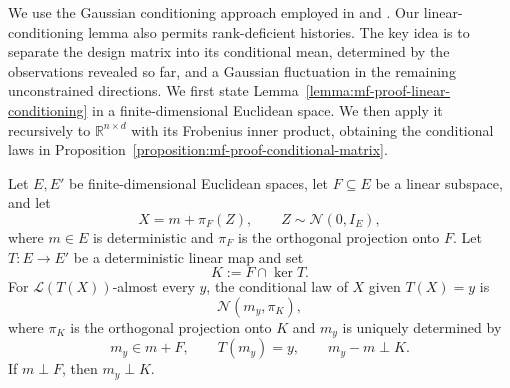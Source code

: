     We use the Gaussian conditioning approach employed in
    \cite{bolthausen2014} and
    \cite[Section~III-H, Lemmas~10--11]{bayati2011dynamics}.
    Our linear-conditioning lemma also permits rank-deficient histories.
    The key idea is to separate the design matrix into its
    conditional mean, determined by the observations revealed so far,
    and a Gaussian fluctuation in the remaining unconstrained directions.
    We first state
    Lemma~\ref{lemma:mf-proof-linear-conditioning}
    in a finite-dimensional Euclidean space.
    We then apply it recursively to $\mathbb R^{n\times d}$
    with its Frobenius inner product, obtaining the conditional
    laws in Proposition~\ref{proposition:mf-proof-conditional-matrix}.

        \begin{lemma}
        \label{lemma:mf-proof-linear-conditioning}
        Let $E,E'$ be finite-dimensional Euclidean spaces,
        let $F\subseteq E$ be a linear subspace, and let
        \[
            X=m+\pi_F (Z),
            \qquad
            Z\sim\mathcal N(0,I_E),
        \]
        where $m\in E$ is deterministic and $\pi_F$ is the
        orthogonal projection onto $F$.
        Let $T:E\to E'$ be a deterministic linear map and set
        \[
            K:=F\cap\ker T.
        \]
        For $\mathscr L(T(X)) $-almost every $y$, the conditional
        law of $X$ given $T(X)=y$ is
        \[
            \mathcal N(m_y,\pi_K),
        \]
        where $\pi_K$ is the orthogonal projection onto $K$
        and $m_y$ is uniquely determined by
        \[
            m_y\in m+F,
            \qquad
            T(m_y)=y,
            \qquad
            m_y-m\perp K.
        \]
        If $m\perp F$, then $m_y\perp K$.
        \end{lemma}

